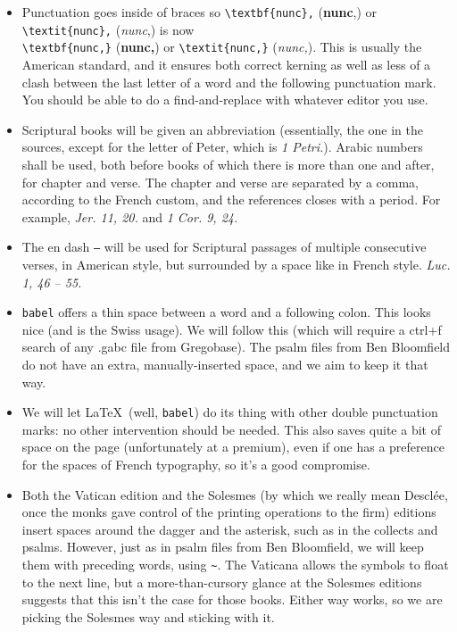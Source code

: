 \documentclass[11pt]{article}
\begin{document}
\begin{itemize}
\item
 Punctuation goes inside of braces so \verb|\textbf{nunc},| (\textbf{nunc},) or \verb|\textit{nunc},| (\textit{nunc},) is now\\ \verb|\textbf{nunc,}| (\textbf{nunc,}) or \verb|\textit{nunc,}| (\textit{nunc,}). This is usually the American standard, and it ensures both correct kerning as well as less of a clash between the last letter of a word and the following punctuation mark. You should be able to do a find-and-replace with whatever editor you use.
 \item
Scriptural books will be given an abbreviation (essentially, the one in the sources, except for the letter of Peter, which is \textit{1 Petri.}). Arabic numbers shall be used, both before books of which there is more than one and after, for chapter and verse. The chapter and verse are separated by a comma, according to the French custom, and the references closes with a period.
 For example, \spurhspace\textit{Jer. 11, 20.} and \textit{1 Cor. 9, 24.}
 \item
The en dash \verb|–| will be used for Scriptural passages of multiple consecutive verses, in American style, but surrounded by a space like in French style. \textit{Luc. 1, 46 – 55.}
\item
\verb|babel| offers a thin space between a word and a following colon. This looks nice (and is the Swiss usage). We will follow this (which will require a ctrl+f search of any .gabc file from Gregobase). The psalm files from Ben Bloomfield do not have an extra, manually-inserted space, and we aim to keep it that way.
\item
We will let \LaTeX\ (well, \verb|babel|) do its thing with other double punctuation marks: no other intervention should be needed. This also saves quite a bit of space on the page (unfortunately at a premium), even if one has a preference for the spaces of French typography, so it's a good compromise.
\item
Both the Vatican edition and the Solesmes (by which we really mean Desclée, once the monks gave control of the printing operations to the firm) editions insert spaces around the dagger and the asterisk, such as in the collects and psalms. However, just as in psalm files from Ben Bloomfield, we will keep them with preceding words, using \verb|~|. The Vaticana allows the symbols to float to the next line, but  a more-than-cursory glance at the Solesmes editions suggests that this isn't the case for those books. Either way works, so we are picking the Solesmes way and sticking with it.

\end{itemize}
\end{document}
